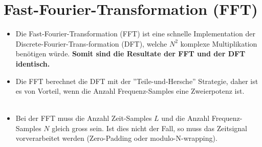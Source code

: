 \section{Fast-Fourier-Transformation (FFT)}
	\begin{itemize}
	 \item Die Fast-Fourier-Transformation (FFT) ist eine schnelle Implementation der Discrete-Fourier-Trans-formation (DFT), welche $N^2$ komplexe Multiplikation benötigen würde. \textbf{Somit sind die Resultate der FFT und der DFT identisch.}
	 \item Die FFT berechnet die DFT mit der ''Teile-und-Hersche'' Strategie, daher ist es von Vorteil, wenn die Anzahl Frequenz-Samples eine Zweierpotenz ist.\\[0.2cm]
	 \\[-0.25cm]
	 \item Bei der FFT muss die Anzahl Zeit-Samples $L$ und die Anzahl Frequenz-Samples $N$ gleich gross sein. Ist dies nicht der Fall, so muss das Zeitsignal vorverarbeitet werden (Zero-Padding oder modulo-N-wrapping).\\[0.2cm]
	 \\[-0.2cm]
	\end{itemize}
	
